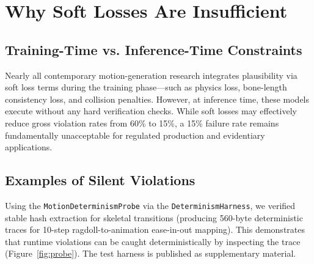 \documentclass[sigconf,nonacm]{acmart}
\begin{document}
\section{Why Soft Losses Are Insufficient}
\label{sec:why-soft}

\subsection{Training-Time vs. Inference-Time Constraints}
Nearly all contemporary motion-generation research integrates plausibility via soft loss terms during the training phase---such as physics loss, bone-length consistency loss, and collision penalties. However, at inference time, these models execute without any hard verification checks. While soft losses may effectively reduce gross violation rates from 60\% to 15\%, a 15\% failure rate remains fundamentally unacceptable for regulated production and evidentiary applications.

\subsection{Examples of Silent Violations}
Using the \texttt{MotionDeterminismProbe} via the \texttt{DeterminismHarness}, we verified stable hash extraction for skeletal transitions (producing 560-byte deterministic traces for 10-step ragdoll-to-animation ease-in-out mapping). This demonstrates that runtime violations can be caught deterministically by inspecting the trace (Figure~\ref{fig:probe}). The test harness is published as supplementary material. %
\end{document}
